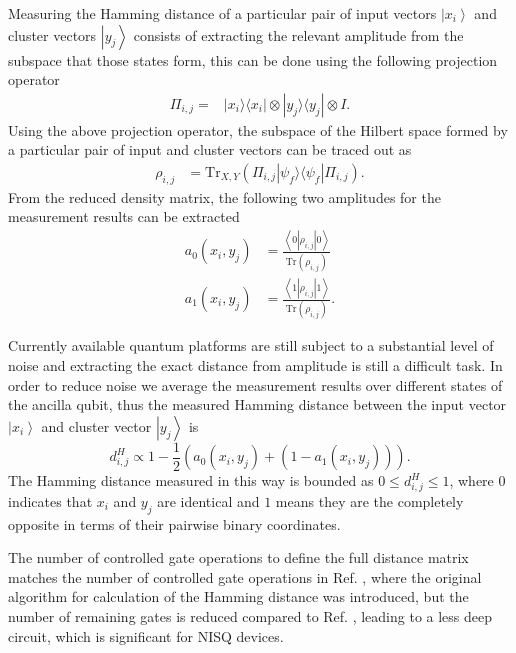 \documentclass[pra,showkeys,twocolumn,showpacs,aps,10pt]{revtex4-2}
\begin{document}
Measuring the Hamming distance of a particular pair of input vectors $\left| x_i \right\rangle$ and cluster vectors $\left| y_j \right\rangle$ consists of extracting the relevant amplitude from the subspace that those states form,
this can be done using the following projection operator
%
\begin{align}
\Pi_{i,j} = &\left| x_i \rangle\langle x_i \right| \otimes \left| y_j \rangle\langle y_j \right| \otimes I .
\end{align}
%
Using the above projection operator, the subspace of the Hilbert space formed by a particular pair of input and cluster vectors can be traced out as
%
\begin{align}
    \rho_{i,j} &= \text{Tr}_{X,Y} (\Pi_{i,j} \left| \psi_f \rangle\langle \psi_f \right| \Pi_{i,j}) .
\end{align}
%
From the reduced density matrix, the following two amplitudes for the measurement results can be extracted
%
\begin{align}
    a_0(x_i,y_j) & = \frac{\left\langle 0 |\rho_{i,j}| 0 \right\rangle}{\text{Tr}(\rho_{i,j})}  \\
    a_1(x_i,y_j) & = \frac{\left\langle 1 |\rho_{i,j}| 1 \right\rangle}{\text{Tr}(\rho_{i,j})} .
\end{align}
%






Currently available quantum platforms are still subject to a substantial level of noise and extracting the exact distance from amplitude is still a difficult task. In order to reduce noise we average the measurement results over different states of the ancilla qubit, thus the measured Hamming distance between the input vector $\left| x_i \right\rangle$ and cluster vector $\left| y_j \right\rangle$ is
%
\begin{equation}\label{eq:amplitudes2distance}
    d_{i,j}^H \propto 1 - \frac{1}{2}(a_0(x_i,y_j) + (1-a_1(x_i,y_j))).
\end{equation}
%
The Hamming distance measured in this way is bounded as $0 \leq d_{i,j}^H \leq 1$,
where  $0$ indicates that $x_i$ and $y_j$ are identical and $1$ means they are the completely opposite in terms of their pairwise binary coordinates.

The number of controlled gate operations to define the full distance matrix matches the number of controlled gate operations in Ref. \cite{trugenberger2001}, where the original algorithm for calculation of the Hamming distance was introduced, but the number of remaining gates is reduced compared to Ref. \cite{trugenberger2001}, leading to a less deep circuit, which is significant for NISQ devices.
\end{document}
